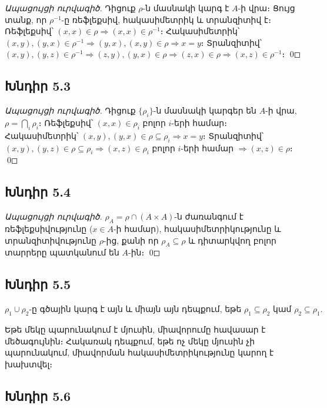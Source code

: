 \emph{Ապացույցի ուրվագիծ.} Դիցուք $\rho$-ն մասնակի կարգ է $A$-ի վրա։ Ցույց տանք, որ $\rho^{-1}$-ը ռեֆլեքսիվ, հակասիմետրիկ և տրանզիտիվ է։
Ռեֆլեքսիվ՝ $(x,x)\in\rho\Rightarrow(x,x)\in\rho^{-1}$։
Հակասիմետրիկ՝ $(x,y),(y,x)\in\rho^{-1}\Rightarrow(y,x),(x,y)\in\rho\Rightarrow x=y$։
Տրանզիտիվ՝ $(x,y),(y,z)\in\rho^{-1}\Rightarrow(z,y),(y,x)\in\rho\Rightarrow(z,x)\in\rho\Rightarrow(x,z)\in\rho^{-1}$։ \qed


\subsection*{Խնդիր 5.3}

\emph{Ապացույցի ուրվագիծ.} Դիցուք $\{\rho_i\}$-ն մասնակի կարգեր են $A$-ի վրա, $\rho=\bigcap_i\rho_i$։
Ռեֆլեքսիվ՝ $(x,x)\in\rho_i$ բոլոր $i$-երի համար։
Հակասիմետրիկ՝ $(x,y),(y,x)\in\rho\subseteq\rho_i\Rightarrow x=y$։
Տրանզիտիվ՝ $(x,y),(y,z)\in\rho\subseteq\rho_i\Rightarrow(x,z)\in\rho_i$ բոլոր $i$-երի համար $\Rightarrow(x,z)\in\rho$։ \qed


\subsection*{Խնդիր 5.4}

\emph{Ապացույցի ուրվագիծ.} $\rho_A=\rho\cap(A\times A)$-ն ժառանգում է ռեֆլեքսիվությունը ($x\in A$-ի համար), հակասիմետրիկությունը և տրանզիտիվությունը $\rho$-ից, քանի որ $\rho_A\subseteq\rho$ և դիտարկվող բոլոր տարրերը պատկանում են $A$-ին։ \qed


\subsection*{Խնդիր 5.5}

$\boxed{\rho_1\cup\rho_2\text{-ը գծային կարգ է այն և միայն այն դեպքում, եթե }\rho_1\subseteq\rho_2\text{ կամ }\rho_2\subseteq\rho_1.}$

Եթե մեկը պարունակում է մյուսին, միավորումը հավասար է մեծագույնին։ Հակառակ դեպքում, եթե ոչ մեկը մյուսին չի պարունակում, միավորման հակասիմետրիկությունը կարող է խախտվել։


\subsection*{Խնդիր 5.6}

